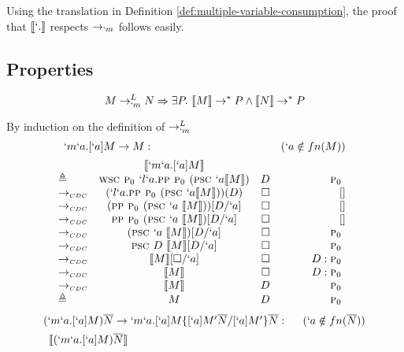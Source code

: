 Using the translation in Definition \ref{def:multiple-variable-consumption}, the proof that $\tr{`.}$ respects $\to_{`m}$ follows easily.

\subsection{Properties}

\begin{theorem}[Soundness of $\tr{`.}$]\label{theorem:soundness}
\[ M \to_{`m}^{L} N \Rightarrow \exists P.\ \llbracket M \rrbracket \to^{*} P \land \llbracket N \rrbracket \to^{*} P \]
\end{theorem}

\begin{Proof}
By induction on the definition of $\rightarrow_{`m}^{L}$
\[
\begin{array}{@{}lcrr}
  \prooflabel{`m`a.[`a]M \to M} & (`a \notin fn(M)) \\
             & \tr{`m`a.[`a]M} \\
  \triangleq & \wsc \gp `l`a.\pp \gp (\psc `a \tr{M}) & D       & \gp \\
  \tocdc\    & (`l`a.\pp \gp (\psc `a \tr{M}))(D)     & \square & []     \\
  \tocdc\    & (\pp \gp (\psc `a\ \tr{M}))[D/`a]      & \square & []     \\
  \tocdc\    & \pp \gp (\psc `a\ \tr{M})[D/`a]        & \square & []     \\
  \tocdc\    & (\psc `a\ \tr{M})[D/`a]                & \square & \gp \\
  \tocdc\    & \psc D\ \tr{M}[D/`a]                   & \square & \gp \\
  \tocdc\    & \tr{M}[\square/`a]                     & \square & D:\gp \\
  \tocdc\    & \tr{M}                                 & \square & D:\gp \\
  \tocdc\    & \tr{M}                                 & D       & \gp \\
  \triangleq & M                                      & D       & \gp \\
\end{array}
\]
\[
\begin{array}{@{}lcrr}
  \prooflabel{(`m`a.[`a]M)\mult{N} \to `m`a.[`a]M\{[`a]M'\mult{N}/[`a]M'\}\mult{N}} & (`a \notin fn(\mult{N})) \\
             & \tr{(`m`a.[`a]M)\mult{N}} \\

\end{array}\]
\end{Proof}

